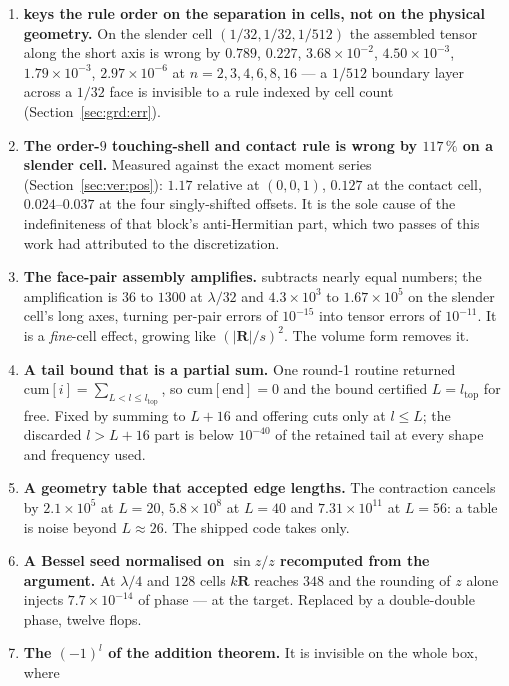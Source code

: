 \begin{enumerate}[leftmargin=1.6em]
\item \textbf{ keys the rule order on the separation in cells, not on the
physical geometry.} On the slender cell $(1/32,1/32,1/512)$ the assembled tensor along the
short axis is wrong by $0.789$, $0.227$, $3.68\times10^{-2}$, $4.50\times10^{-3}$,
$1.79\times10^{-3}$, $2.97\times10^{-6}$ at $n = 2,3,4,6,8,16$ --- a $1/512$ boundary layer
across a $1/32$ face is invisible to a rule indexed by cell count
(Section~\ref{sec:grd:err}).
\item \textbf{The order-$9$ touching-shell and contact rule is wrong by $117\,\%$ on a
slender cell.} Measured against the exact moment series
(Section~\ref{sec:ver:pos}): $1.17$ relative at $(0,0,1)$, $0.127$ at the contact cell,
$0.024$--$0.037$ at the four singly-shifted offsets. It is the sole cause of the
indefiniteness of that block's anti-Hermitian part, which two passes of this work had
attributed to the discretization.
\item \textbf{The face-pair assembly amplifies.}  subtracts nearly equal
numbers; the amplification is $36$ to $1300$ at $\lambda/32$ and $4.3\times10^{3}$ to
$1.67\times10^{5}$ on the slender cell's long axes, turning per-pair errors of
$10^{-15}$ into tensor errors of $10^{-11}$. It is a \emph{fine}-cell effect, growing like
$(|\mathbf{R}|/s)^2$. The volume form removes it.
\item \textbf{A tail bound that is a partial sum.} One round-1 routine returned
$\mathrm{cum}[i] = \sum_{L<l\le l_{\mathrm{top}}}$, so $\mathrm{cum}[\mathrm{end}] = 0$ and
the bound certified $L = l_{\mathrm{top}}$ for free. Fixed by summing to $L + 16$ and
offering cuts only at $l \le L$; the discarded $l > L+16$ part is below $10^{-40}$ of the
retained tail at every shape and frequency used.
\item \textbf{A geometry table that accepted  edge lengths.} The contraction
cancels by $2.1\times10^{5}$ at $L = 20$, $5.8\times10^{8}$ at $L = 40$ and
$7.31\times10^{11}$ at $L = 56$: a  table is noise beyond $L \approx 26$. The
shipped code takes  only.
\item \textbf{A Bessel seed normalised on $\sin z/z$ recomputed from the 
argument.} At $\lambda/4$ and $128$ cells $k\mathbf{R}$ reaches $348$ and the rounding of
$z$ alone injects $7.7\times10^{-14}$ of phase --- at the target. Replaced by a
double-double phase, twelve flops.
\item \textbf{The $(-1)^l$ of the addition theorem.} It is invisible on the whole box, where

\end{enumerate}
